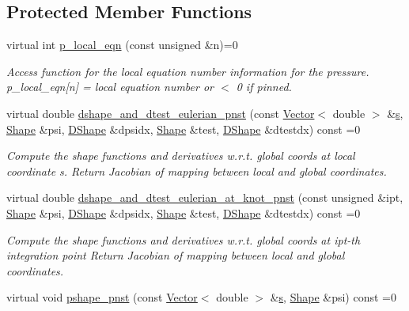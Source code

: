 \subsection*{Protected Member Functions}
\begin{DoxyCompactItemize}
\item 
virtual int \hyperlink{classoomph_1_1PolarNavierStokesEquations_a4738c2cb0df9ba80c581442ceade039e}{p\+\_\+local\+\_\+eqn} (const unsigned \&n)=0
\begin{DoxyCompactList}\small\item\em Access function for the local equation number information for the pressure. p\+\_\+local\+\_\+eqn\mbox{[}n\mbox{]} = local equation number or $<$ 0 if pinned. \end{DoxyCompactList}\item 
virtual double \hyperlink{classoomph_1_1PolarNavierStokesEquations_a5be752caefa4421e221aaccd4712ec11}{dshape\+\_\+and\+\_\+dtest\+\_\+eulerian\+\_\+pnst} (const \hyperlink{classoomph_1_1Vector}{Vector}$<$ double $>$ \&\hyperlink{cfortran_8h_ab7123126e4885ef647dd9c6e3807a21c}{s}, \hyperlink{classoomph_1_1Shape}{Shape} \&psi, \hyperlink{classoomph_1_1DShape}{D\+Shape} \&dpsidx, \hyperlink{classoomph_1_1Shape}{Shape} \&test, \hyperlink{classoomph_1_1DShape}{D\+Shape} \&dtestdx) const =0
\begin{DoxyCompactList}\small\item\em Compute the shape functions and derivatives w.\+r.\+t. global coords at local coordinate s. Return Jacobian of mapping between local and global coordinates. \end{DoxyCompactList}\item 
virtual double \hyperlink{classoomph_1_1PolarNavierStokesEquations_a7fda7aac0b9eb09410dfff38f992374c}{dshape\+\_\+and\+\_\+dtest\+\_\+eulerian\+\_\+at\+\_\+knot\+\_\+pnst} (const unsigned \&ipt, \hyperlink{classoomph_1_1Shape}{Shape} \&psi, \hyperlink{classoomph_1_1DShape}{D\+Shape} \&dpsidx, \hyperlink{classoomph_1_1Shape}{Shape} \&test, \hyperlink{classoomph_1_1DShape}{D\+Shape} \&dtestdx) const =0
\begin{DoxyCompactList}\small\item\em Compute the shape functions and derivatives w.\+r.\+t. global coords at ipt-\/th integration point Return Jacobian of mapping between local and global coordinates. \end{DoxyCompactList}\item 
virtual void \hyperlink{classoomph_1_1PolarNavierStokesEquations_a1b382bf38d7b7041417bbc91ad85b38f}{pshape\+\_\+pnst} (const \hyperlink{classoomph_1_1Vector}{Vector}$<$ double $>$ \&\hyperlink{cfortran_8h_ab7123126e4885ef647dd9c6e3807a21c}{s}, \hyperlink{classoomph_1_1Shape}{Shape} \&psi) const =0

\end{DoxyCompactItemize}
